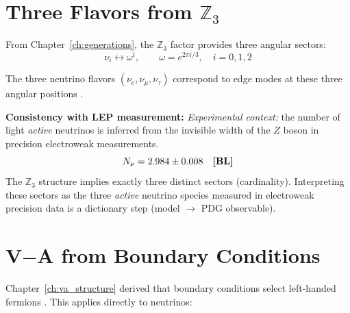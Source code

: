 \section{Three Flavors from $\mathbb{Z}_3$}
\label{sec:three_flavors}

From Chapter~\ref{ch:generations}, the $\mathbb{Z}_3$ factor provides three angular sectors:
\begin{equation}
    \nu_i \leftrightarrow \omega^i, \qquad \omega = e^{2\pi i/3}, \quad i = 0, 1, 2
\end{equation}

The three neutrino flavors $(\nu_e, \nu_\mu, \nu_\tau)$ correspond to edge modes
at these three angular positions \tagI{}.

\textbf{Consistency with LEP measurement:}
\emph{Experimental context:} the number of light \emph{active} neutrinos is inferred
from the invisible width of the $Z$ boson in precision electroweak measurements.
\begin{equation}
    N_\nu = 2.984 \pm 0.008 \quad \textbf{[BL]}{}
\end{equation}
The $\mathbb{Z}_3$ structure \tagDer{} implies exactly three distinct sectors
(cardinality). Interpreting these sectors as the three \emph{active} neutrino
species measured in electroweak precision data is a dictionary step \tagDc{}
(model $\rightarrow$ PDG observable).

\section{V$-$A from Boundary Conditions}
\label{sec:va_connection}

Chapter~\ref{ch:va_structure} derived that boundary conditions select left-handed
fermions \tagDc{}. This applies directly to neutrinos:

